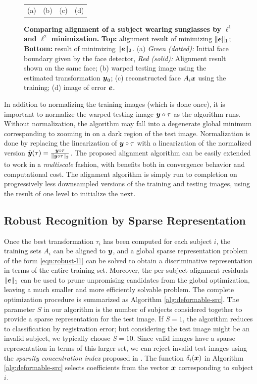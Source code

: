 \documentclass[10pt,journal,letterpaper,compsoc]{IEEEtran} %
\begin{document}
\begin{figure}
{\begin{tabular}{cccc}
(a) & (b) & (c) & (d)
\end{tabular}
\vspace{0mm}}
\caption{{\bf Comparing alignment of a subject wearing sunglasses by
$\ell^1$ and $\ell^2$ minimization.}
{\bf Top:} alignment result of minimizing $\|\boldsymbol{e}\|_1$; {\bf Bottom:}
result of minimizing $\|\boldsymbol{e}\|_2$. (a) {\em Green (dotted):} Initial face boundary
given by the face detector, {\em Red (solid):} Alignment result shown on the same
face; (b) warped testing image using the estimated transformation ${\boldsymbol{y}}_0$;
(c) reconstructed face $A_i{\boldsymbol{x}}$ using the training; (d) image of error $\boldsymbol{e}$. }\label{fig:L1-L2-align}
\vspace{0mm}
\end{figure}

In addition to normalizing the training images (which is done
once), it is important to normalize the warped testing image
${\boldsymbol{y}} \circ \tau$ as the algorithm runs.  Without normalization,
the algorithm may fall into a degenerate global minimum
corresponding to zooming in on a dark region of the test
image.  Normalization is done by replacing the linearization of
${\boldsymbol{y}} \circ \tau$ with a linearization of the normalized version
$\tilde {{\boldsymbol{y}}}(\tau) = \frac{{\boldsymbol{y}} \circ \tau}{\|{\boldsymbol{y}} \circ \tau\|_2}$.
The proposed alignment algorithm can be easily extended to work
in a {\em multiscale} fashion, with benefits both in
convergence behavior and computational cost.  The alignment
algorithm is simply run to completion on progressively less
downsampled versions of the training and testing images, using
the result of one level to initialize the next.

\subsection{Robust Recognition by Sparse Representation} Once
the best transformation $\tau_i$ has been computed for each
subject $i$, the training sets $A_i$ can be aligned to ${\boldsymbol{y}}$,
and a global sparse representation problem of the form
\eqref{eqn:robust-l1} can be solved to obtain a discriminative
representation in terms of the entire training set. Moreover,
the per-subject alignment residuals $\| \boldsymbol{e} \|_1$ can be used to
prune unpromising candidates from the global optimization,
leaving a much smaller and more efficiently solvable problem.
The complete optimization procedure is summarized as Algorithm
\ref{alg:deformable-src}. The parameter $S$ in our algorithm is the number of subjects
considered together to provide a sparse representation for the
test image. If $S = 1$, the algorithm reduces to classification
by registration error; but considering the test image might be
an invalid subject, we typically choose $S = 10$. Since valid
images have a sparse representation in terms of this larger
set, we can reject invalid test images using the {\em sparsity
concentration index} proposed in \cite{Wright2009-PAMI}.
The function $\delta_i({\boldsymbol{x}})$ in Algorithm \ref{alg:deformable-src}
selects coefficients from the vector ${\boldsymbol{x}}$ corresponding to subject $i$.
\end{document}
